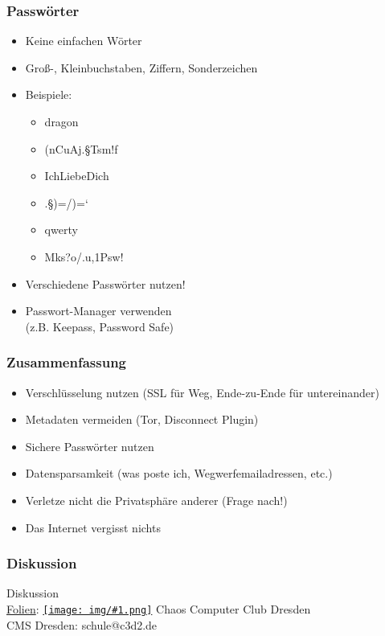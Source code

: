 \documentclass[12pt]{beamer}
\newcommand{\cc}[1]{\texttt{[image: img/\#1.png]}\hspace{1mm}}
\begin{document}
\begin{frame}
    \frametitle{Passwörter}
    \begin{itemize}
        \item<2-> Keine einfachen Wörter
        \item<3-> Groß-, Kleinbuchstaben, Ziffern, Sonderzeichen
        \item<4-> Beispiele:
            \begin{itemize}
                \item<5-> dragon
                \item<6-> (nCuAj.§Tsm!f
                \item<7-> IchLiebeDich
                \item<8-> .§)=/)=`
                \item<9-> qwerty
                \item<10-> Mks?o/.u,1Psw!
            \end{itemize}
        \item<12-> Verschiedene Passwörter nutzen!
        \item<13-> Passwort-Manager verwenden \\ (z.B. Keepass, Password Safe)
    \end{itemize}
\end{frame}

\begin{frame}
    \frametitle{Zusammenfassung}
    \begin{itemize}
        \item<2-> Verschlüsselung nutzen (SSL für Weg, Ende-zu-Ende für untereinander)
        \item<3-> Metadaten vermeiden (Tor, Disconnect Plugin)
        \item<4-> Sichere Passwörter nutzen
        \item<5-> Datensparsamkeit (was poste ich, Wegwerfemailadressen, etc.)
        \item<6-> Verletze nicht die Privatsphäre anderer (Frage nach!)
        \item<7-> Das Internet vergisst nichts
    \end{itemize}
\end{frame}

\begin{frame}
  \frametitle{Diskussion}
  \begin{center}
    {\Large Diskussion}\\
    \vspace{5mm}
    \href{https://github.com/c3d2/cms-nsa}{Folien}: \href{https://creativecommons.org/licenses/by-sa/4.0/}{\cc{by-sa}} Chaos Computer Club Dresden \\
    \vspace{4mm}
    CMS Dresden: schule@c3d2.de
  \end{center}
\end{frame}
\end{document}
